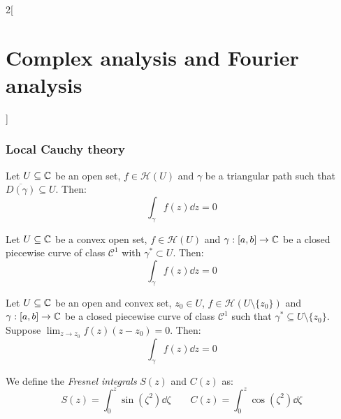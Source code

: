 \documentclass[../../../main.tex]{subfiles}
\begin{document}
\begin{multicols}{2}[\section{Complex analysis and Fourier analysis}]
  \subsubsection{Local Cauchy theory}
  \begin{theorem}
    Let $U\subseteq \mathbb{C}$ be an open set, $f\in\mathcal{H}(U)$ and $\gamma$ be a triangular path such that $\overline{D(\gamma)}\subseteq U$. Then: $$\int_\gamma f(z)\dd{z}=0$$
  \end{theorem}
  \begin{theorem}
    Let $U\subseteq \mathbb{C}$ be a convex open set, $f\in\mathcal{H}(U)$ and $\gamma:[a,b]\rightarrow\mathbb{C}$ be a closed piecewise curve of class $\mathcal{C}^1$ with $\gamma^*\subset U$. Then: $$\int_\gamma f(z)\dd{z}=0$$
  \end{theorem}
  \begin{lemma}
    Let $U\subseteq \mathbb{C}$ be an open and convex set, $z_0\in U$, $f\in\mathcal{H}(U\setminus\{z_0\})$ and $\gamma:[a,b]\rightarrow\mathbb{C}$ be a closed piecewise curve of class $\mathcal{C}^1$ such that $\gamma^*\subseteq U\setminus\{z_0\}$. Suppose $\displaystyle\lim_{z\to z_0}f(z)(z-z_0)=0$. Then: $$\int_\gamma f(z)\dd{z}=0$$
  \end{lemma}
  \begin{definition}
    We define the \emph{Fresnel integrals} $S(z)$ and $C(z)$ as:
    $$S(z)=\int_0^z\sin(\zeta^2)\dd{\zeta}\qquad C(z)=\int_0^z\cos(\zeta^2)\dd{\zeta}$$
  \end{definition}

\end{multicols}
\end{document}
